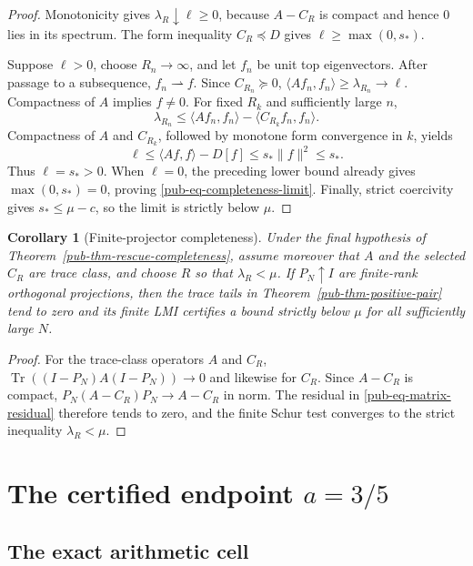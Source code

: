 \documentclass[11pt]{article}
\newtheorem{corollary}[theorem]{Corollary}
\theoremstyle{remark}
\DeclareMathOperator{\Tr}{Tr}
\begin{document}
\begin{proof}
Monotonicity gives \(\lambda_R\downarrow\ell\geq0\),
because \(A-C_R\) is compact and hence \(0\) lies in its spectrum.
The form inequality \(C_R\preceq D\) gives \(\ell\geq\max(0,s_*)\).

Suppose \(\ell>0\), choose \(R_n\to\infty\), and let \(f_n\) be unit top eigenvectors.
After passage to a subsequence, \(f_n\rightharpoonup f\).
Since \(C_{R_n}\succeq0\), \(\langle Af_n,f_n\rangle\geq\lambda_{R_n}\to\ell\).
Compactness of \(A\) implies \(f\neq0\).
For fixed \(R_k\) and sufficiently large \(n\),
\[
 \lambda_{R_n}\leq
 \langle Af_n,f_n\rangle-\langle C_{R_k}f_n,f_n\rangle.
\]
Compactness of \(A\) and \(C_{R_k}\), followed by monotone form convergence in \(k\), yields
\[
 \ell\leq\langle Af,f\rangle-D[f]
 \leq s_*\lVert f\rVert^2\leq s_*.
\]
Thus \(\ell=s_*>0\).
When \(\ell=0\), the preceding lower bound already gives \(\max(0,s_*)=0\),
proving \eqref{pub-eq-completeness-limit}.
Finally, strict coercivity gives \(s_*\leq\mu-c\), so the limit is strictly below \(\mu\).
\end{proof}

\begin{corollary}[Finite-projector completeness]
\label{pub-cor-finite-projector-completeness}
Under the final hypothesis of Theorem~\ref{pub-thm-rescue-completeness},
assume moreover that \(A\) and the selected \(C_R\) are trace class,
and choose \(R\) so that \(\lambda_R<\mu\).
If \(P_N\uparrow I\) are finite-rank orthogonal projections,
then the trace tails in Theorem~\ref{pub-thm-positive-pair} tend to zero and its finite LMI certifies a bound strictly below \(\mu\) for all sufficiently large \(N\).
\end{corollary}

\begin{proof}
For the trace-class operators \(A\) and \(C_R\),
\(\Tr((I-P_N)A(I-P_N))\to0\) and likewise for \(C_R\).
Since \(A-C_R\) is compact, \(P_N(A-C_R)P_N\to A-C_R\) in norm.
The residual in \eqref{pub-eq-matrix-residual} therefore tends to zero,
and the finite Schur test converges to the strict inequality \(\lambda_R<\mu\).
\end{proof}

\section{The certified endpoint \texorpdfstring{\(a=3/5\)}{a=3/5}}
\label{pub-sec-certificate}

\subsection{The exact arithmetic cell}
\end{document}
